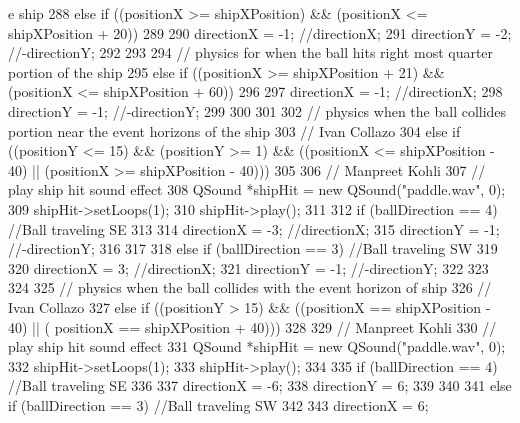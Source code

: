 \begin{DoxyCode}
{{{{{      e ship
288                     else if ((positionX >= shipXPosition) && (positionX <= 
      shipXPosition + 20))
289                     {
290                         directionX = -1;    //directionX;
291                         directionY = -2;    //-directionY;
292                     }
293 
294                     // physics for when the ball hits right most quarter portion 
      of the ship
295                     else if ((positionX >= shipXPosition + 21) && (positionX <= 
      shipXPosition + 60))
296                     {
297                         directionX = -1;    //directionX;
298                         directionY = -1;    //-directionY;
299                     }
300                 }
301             }
302             // physics when the ball collides portion near the event horizons of 
      the ship
303             // Ivan Collazo
304             else if ((positionY <= 15) && (positionY >= 1) && ((positionX <= 
      shipXPosition - 40) || (positionX >= shipXPosition - 40)))
305             {
306                 // Manpreet Kohli
307                 // play ship hit sound effect
308                 QSound *shipHit = new QSound("paddle.wav", 0);
309                 shipHit->setLoops(1);
310                 shipHit->play();
311 
312                 if (ballDirection == 4)     //Ball traveling SE
313                 {
314                     directionX = -3;        //directionX;
315                     directionY = -1;        //-directionY;
316                 }
317 
318                 else if (ballDirection == 3) //Ball traveling SW
319                 {
320                     directionX = 3;         //directionX;
321                     directionY = -1;        //-directionY;
322                 }
323             }
324 
325             // physics when the ball collides with the event horizon of ship
326             // Ivan Collazo
327             else if ((positionY > 15) && ((positionX == shipXPosition - 40) || (
      positionX == shipXPosition + 40)))
328             {
329                 // Manpreet Kohli
330                 // play ship hit sound effect
331                 QSound *shipHit = new QSound("paddle.wav", 0);
332                 shipHit->setLoops(1);
333                 shipHit->play();
334 
335                 if (ballDirection == 4)     //Ball traveling SE
336                 {
337                     directionX = -6;
338                     directionY = 6;
339                 }
340 
341                 else if (ballDirection == 3) //Ball traveling SW
342                 {
343                     directionX = 6;
}}}}}
\end{DoxyCode}
